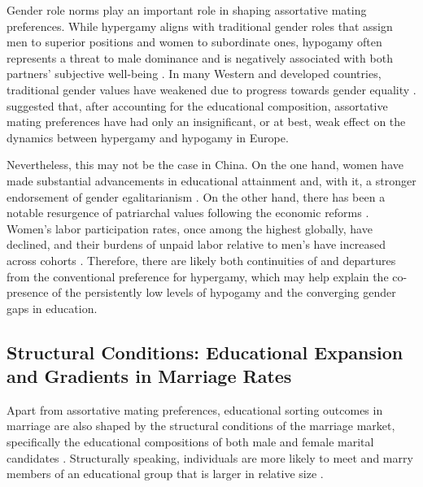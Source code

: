 Gender role norms play an important role in shaping assortative mating preferences. While hypergamy aligns with traditional gender roles that assign men to superior positions and women to subordinate ones, hypogamy often represents a threat to male dominance and is negatively associated with both partners' subjective well-being \parencite{potarcaAreWomenHypogamous2022}. In many Western and developed countries, traditional gender values have weakened due to progress towards gender equality \parencite{bertrandSocialNormsLabour2021,kalmijnEducationalGradientMarriage2013}. \textcite{leeschStructuralOpportunitiesAssortative2024} suggested that, after accounting for the educational composition, assortative mating preferences have had only an insignificant, or at best, weak effect on the dynamics between hypergamy and hypogamy in Europe.

Nevertheless, this may not be the case in China. On the one hand, women have made substantial advancements in educational attainment and, with it, a stronger endorsement of gender egalitarianism \parencite{yeungHigherEducationExpansion2013}. On the other hand, there has been a notable resurgence of patriarchal values following the economic reforms \parencite{jiUnequalCareUnequal2017,muMaritalAgeHomogamy2014}. Women's labor participation rates, once among the highest globally, have declined, and their burdens of unpaid labor relative to men's have increased across cohorts \parencite{luoGenderDivisionHousehold2018}. Therefore, there are likely both continuities of and departures from the conventional preference for hypergamy, which may help explain the co-presence of the persistently low levels of hypogamy and the converging gender gaps in education.

\subsection{Structural Conditions: Educational Expansion and Gradients in Marriage Rates}

Apart from assortative mating preferences, educational sorting outcomes in marriage are also shaped by the structural conditions of the marriage market, specifically the educational compositions of both male and female marital candidates \parencite{kalmijnIntermarriageHomogamyCauses1998,oppenheimerTheoryMarriageTiming1988}. Structurally speaking, individuals are more likely to meet and marry members of an educational group that is larger in relative size \parencite{blauInequalityHeterogeneityPimitive1977,blauHeterogeneityIntermarriage1982}.

